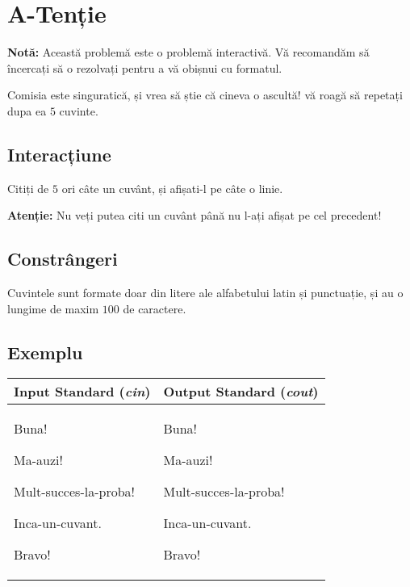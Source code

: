 \documentclass[12pt,a4paper]{article}
\begin{document}


\section*{A-Tenție}

\textbf{Notă:} Această problemă este o problemă interactivă. Vă recomandăm să încercați să o rezolvați pentru a vă obișnui cu formatul.

\vspace{1em}

Comisia este singuratică, și vrea să știe că cineva o ascultă! vă roagă să repetați dupa ea $5$ cuvinte.


\subsection*{Interacțiune}

Citiți de $5$ ori câte un cuvânt, și afișati-l pe câte o linie.

\textbf{Atenție:} Nu veți putea citi un cuvânt până nu l-ați afișat pe cel precedent!

\subsection*{Constrângeri}

Cuvintele sunt formate doar din litere ale alfabetului latin și punctuație, și au o lungime de maxim $100$ de caractere.

\subsection*{Exemplu}

\begin{tabular}{|@{}p{}@{}|@{}p{}@{}|}
\hline
\multicolumn{1}{|c|}{\bfseries Input Standard (\textit{cin})} &
\multicolumn{1}{c|}{\bfseries Output Standard (\textit{cout})} \\
\hline
\begin{textQuoteCell}
Buna!

Ma-auzi!

Mult-succes-la-proba!

Inca-un-cuvant.

Bravo!
\end{textQuoteCell} &
\begin{textQuoteCell}

Buna!

Ma-auzi!

Mult-succes-la-proba!

Inca-un-cuvant.

Bravo!
\end{textQuoteCell} \\    
\hline
\end{tabular}
\vspace{1em}
\end{document}
